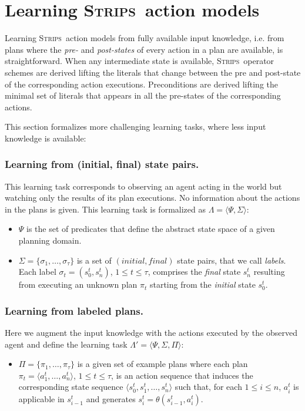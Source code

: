\documentclass[letterpaper]{article} %
\newcommand{\tup}[1]{{\langle #1 \rangle}}
\newcommand{\strips}{\textsc{Strips}}     %
\begin{document}
\section{Learning \strips\ action models}
Learning \strips\ action models from fully available input knowledge, i.e. from plans where the {\em pre-} and {\em post-states} of every action in a plan are available, is straightforward. When any intermediate state is available, \strips\ operator schemes are derived lifting the literals that change between the pre and post-state of the corresponding action executions. Preconditions are derived lifting the minimal set of literals that appears in all the pre-states of the corresponding actions.

This section formalizes more challenging learning tasks, where less input knowledge is available:

\subsubsection{Learning from (initial, final) state pairs.} This learning task corresponds to observing an agent acting in the world but watching only the results of its plan executions. No information about the actions in the plans is given. This learning task is formalized as $\Lambda=\tup{\Psi,\Sigma}$:
\begin{itemize}
\item $\Psi$ is the set of predicates that define the abstract state space of a given planning domain.
\item $\Sigma=\{\sigma_1,\ldots,\sigma_{\tau}\}$ is a set of $(initial, final)$ state pairs, that we call {\em labels}. Each label $\sigma_t=(s_0^t,s_{n}^t)$, {\tt\small $1\leq t\leq \tau$}, comprises the {\em final} state $s_{n}^t$ resulting from executing an unknown plan $\pi_t$ starting from the {\em initial} state $s_0^t$.
\end{itemize}

\subsubsection{Learning from labeled plans.}
Here we augment the input knowledge with the actions executed by the observed agent and define the learning task $\Lambda'=\tup{\Psi,\Sigma,\Pi}$:

\begin{itemize}
\item $\Pi=\{\pi_1,\ldots,\pi_{\tau}\}$ is a given set of example plans where each plan $\pi_t=\tup{a_1^t, \ldots, a_n^t}$, {\small $1\leq t\leq \tau$}, is an action sequence that induces the corresponding state sequence $\tup{s_0^t, s_1^t, \ldots, s_n^t}$ such that, for each {\small $1\leq i\leq n$}, $a_i^t$ is applicable in $s_{i-1}^t$ and generates $s_i^t=\theta(s_{i-1}^t,a_i^t)$.
\end{itemize}
\end{document}
